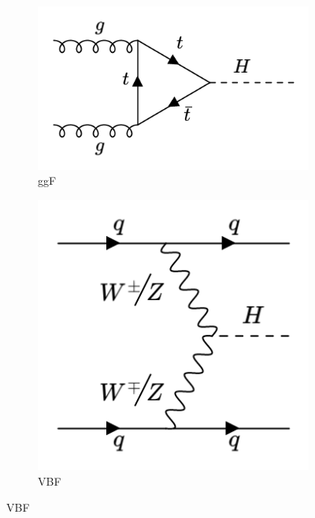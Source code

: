 \begin{figure}[htp]
  \centering
         \begin{subfigure}[b]{0.3\textwidth}
         \centering
         \includegraphics[width=\textwidth]{figures/theory_chapter/ggF.png}
         \caption{ggF}
         \label{fig:ggH}
     \end{subfigure}
     \hfill
       \begin{subfigure}[b]{0.3\textwidth}
         \centering
         \includegraphics[width=\textwidth]{figures/theory_chapter/VBF.png}
         \caption{VBF}
         \label{fig:VBF}
     \end{subfigure}

\end{figure}
